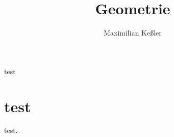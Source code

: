 \documentclass{article}
\title{Geometrie}
\author{Maximilian Keßler}
\begin{document}
    \maketitle
    test

    \section{test}
    \label{foo}

     test.
\end{document}
